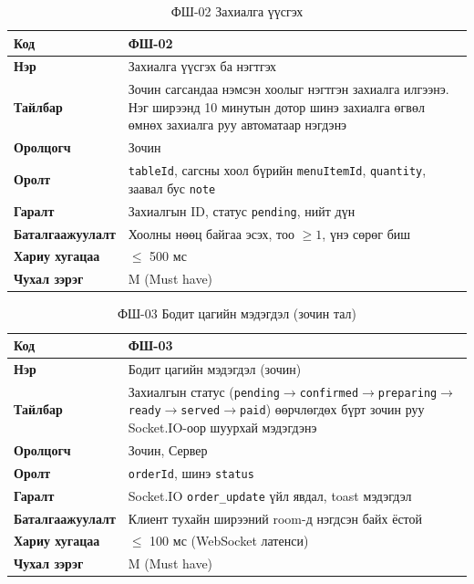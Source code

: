 \begin{table}[htbp]
\caption{ФШ-02 Захиалга үүсгэх}
\label{tab:fr02}
\centering
\small
\begin{tabularx}{\textwidth}{|l|L|}
\hline
{}
\textbf{Код} & ФШ-02 \\ \hline
\textbf{Нэр} & Захиалга үүсгэх ба нэгтгэх \\ \hline
{}
\textbf{Тайлбар} & Зочин сагсандаа нэмсэн хоолыг нэгтгэн захиалга илгээнэ. Нэг ширээнд 10 минутын дотор шинэ захиалга өгвөл өмнөх захиалга руу автоматаар нэгдэнэ \\ \hline
\textbf{Оролцогч} & Зочин \\ \hline
{}
\textbf{Оролт} & \texttt{tableId}, сагсны хоол бүрийн \texttt{menuItemId}, \texttt{quantity}, заавал бус \texttt{note} \\ \hline
\textbf{Гаралт} & Захиалгын ID, статус \texttt{pending}, нийт дүн \\ \hline
{}
\textbf{Баталгаажуулалт} & Хоолны нөөц байгаа эсэх, тоо $\geq 1$, үнэ сөрөг биш \\ \hline
\textbf{Хариу хугацаа} & $\leq$ 500 мс \\ \hline
{}
\textbf{Чухал зэрэг} & M (Must have) \\ \hline
\end{tabularx}
\end{table}

\begin{table}[htbp]
\caption{ФШ-03 Бодит цагийн мэдэгдэл (зочин тал)}
\label{tab:fr03}
\centering
\small
\begin{tabularx}{\textwidth}{|l|L|}
\hline
{}
\textbf{Код} & ФШ-03 \\ \hline
\textbf{Нэр} & Бодит цагийн мэдэгдэл (зочин) \\ \hline
{}
\textbf{Тайлбар} & Захиалгын статус (\texttt{pending}$\to$\texttt{confirmed}$\to$\texttt{preparing}$\to$\texttt{ready}$\to$\texttt{served}$\to$\texttt{paid}) өөрчлөгдөх бүрт зочин руу Socket.IO-оор шуурхай мэдэгдэнэ \\ \hline
\textbf{Оролцогч} & Зочин, Сервер \\ \hline
{}
\textbf{Оролт} & \texttt{orderId}, шинэ \texttt{status} \\ \hline
\textbf{Гаралт} & Socket.IO \texttt{order\_update} үйл явдал, toast мэдэгдэл \\ \hline
{}
\textbf{Баталгаажуулалт} & Клиент тухайн ширээний room-д нэгдсэн байх ёстой \\ \hline
\textbf{Хариу хугацаа} & $\leq$ 100 мс (WebSocket латенси) \\ \hline
{}
\textbf{Чухал зэрэг} & M (Must have) \\ \hline
\end{tabularx}
\end{table}

